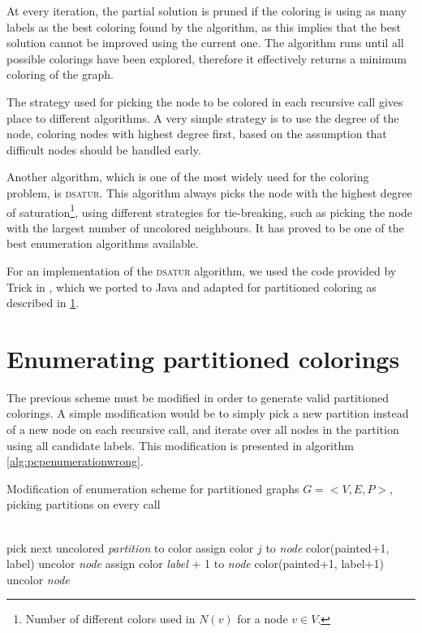 At every iteration, the partial solution is pruned if the coloring is using as many labels as the best coloring found by the algorithm, as this implies that the best solution cannot be improved using the current one. The algorithm runs until all possible colorings have been explored, therefore it effectively returns a minimum coloring of the graph.

The strategy used for picking the node to be colored in each recursive call gives place to different algorithms. A very simple strategy is to use the degree of the node, coloring nodes with highest degree first, based on the assumption that difficult nodes should be handled early.

Another algorithm, which is one of the most widely used for the coloring problem, is \textsc{dsatur}\cite{brelaz1979new}. This algorithm always picks the node with the highest degree of saturation\footnote{Number of different colors used in $N(v)$ for a node $v \in V$.}, using different strategies for tie-breaking, such as picking the node with the largest number of uncolored neighbours\cite{sewell1996improved}. It has proved to be one of the best enumeration algorithms available.

For an implementation of the \textsc{dsatur} algorithm, we used the code provided by Trick in \cite{trickdsatur}, which we ported to Java and adapted for partitioned coloring as described in \ref{subsec:heur:enumpcp}.

\section{Enumerating partitioned colorings}
\label{subsec:heur:enumpcp}

The previous scheme must be modified in order to generate valid partitioned colorings. A simple modification would be to simply pick a new partition instead of a new node on each recursive call, and iterate over all nodes in the partition using all candidate labels. This modification is presented in algorithm \ref{alg:pcpenumerationwrong}. 

\begin{algorithm}
\caption{Modification of enumeration scheme for partitioned graphs $G = <V,E,P>$, picking partitions on every call}
\label{alg:pcpenumerationwrong}

\begin{algorithmic}
	\STATE [...] \\
		\STATE pick next uncolored \textit{partition} to color		
					\STATE assign color $j$ to \textit{node}
					\CALL color(painted+1, label)
					\STATE uncolor \textit{node}
				\ENDIF
			\ENDFOR
			\STATE assign color \textit{label} + 1 to \textit{node}
			\CALL color(painted+1, label+1)
			\STATE uncolor \textit{node}
		\ENDFOR
	\ENDPROC	
\end{algorithmic}
\end{algorithm}

